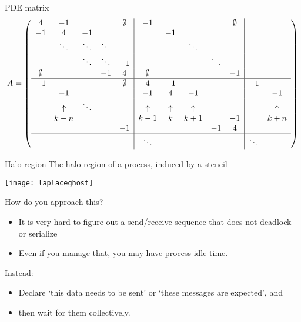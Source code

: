 \begin{numberedframe}{PDE matrix}
  \footnotesize
  \[
    A=
    \left(\begin{array}{ccccc|ccccc|cc}
      4&-1&&&\emptyset&-1&&&&\emptyset&\\ 
      -1&4&-1&&&&-1&&&&\\ 
      &\ddots&\ddots&\ddots&&&&\ddots&&\\ 
      &&\ddots&\ddots&-1&&&&\ddots&\\ 
      \emptyset&&&-1&4&\emptyset&&&&-1&\\ \hline
      -1&&&&\emptyset&4&-1&&&&-1\\
      &-1      &      &&&-1      &4       &-1      &&&&-1\\
      &\uparrow&\ddots&&&\uparrow&\uparrow&\uparrow&&  &&\uparrow\\
      &k-n     &      &&&k-1     &k       &k+1     &&-1&&k+n\\
      &&&&-1&&&&-1&4&&\\ \hline
      &        &      &&&\ddots  &        &        &&  &\ddots\\
    \end{array}\right)
    \]
\end{numberedframe}

\begin{numberedframe}{Halo region}
  The halo region of a process, induced by a stencil

  \texttt{[image: laplaceghost]}
\end{numberedframe}

\begin{numberedframe}{How do you approach this?}
  \begin{itemize}
  \item It is very hard to figure out a send/receive sequence that
    does not deadlock or serialize
  \item Even if you manage that, you may have process idle time.
  \end{itemize}
  Instead: 
  \begin{itemize}
  \item Declare `this data needs to be sent' or `these messages are expected', and
  \item then wait for them collectively.
  \end{itemize}
\end{numberedframe}

